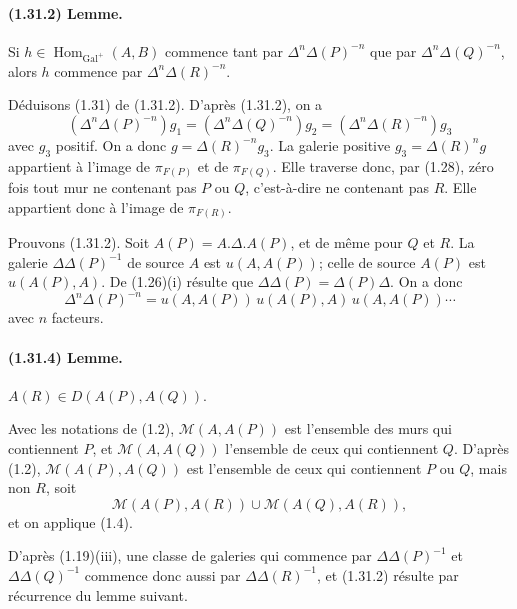 \documentclass[10pt]{article}
\begin{document}
\paragraph{(1.31.2) Lemme.} Si \(h\in\operatorname{Hom}_{\operatorname{Gal}^+}(A,B)\) commence tant par \(\Delta^n\Delta(P)^{-n}\) que par \(\Delta^n\Delta(Q)^{-n}\), alors \(h\) commence par \(\Delta^n\Delta(R)^{-n}\).

Déduisons (1.31) de (1.31.2). D'après (1.31.2), on a
\[
(\Delta^n\Delta(P)^{-n})g_1=(\Delta^n\Delta(Q)^{-n})g_2=(\Delta^n\Delta(R)^{-n})g_3
\]
avec \(g_3\) positif. On a donc \(g=\Delta(R)^{-n}g_3\). La galerie positive \(g_3=\Delta(R)^n g\) appartient à l'image de \(\pi_{F(P)}\) et de \(\pi_{F(Q)}\). Elle traverse donc, par (1.28), zéro fois tout mur ne contenant pas \(P\) ou \(Q\), c'est-à-dire ne contenant pas \(R\). Elle appartient donc à l'image de \(\pi_{F(R)}\).

Prouvons (1.31.2). Soit \(A(P)=A.\Delta.A(P)\), et de même pour \(Q\) et \(R\). La galerie \(\Delta\Delta(P)^{-1}\) de source \(A\) est \(u(A,A(P))\); celle de source \(A(P)\) est \(u(A(P),A)\). De (1.26)(i) résulte que \(\Delta\Delta(P)=\Delta(P)\Delta\). On a donc
\[
\tag{1.31.3}
\Delta^n\Delta(P)^{-n}=u(A,A(P))\,u(A(P),A)\,u(A,A(P))\cdots
\]
avec \(n\) facteurs.

\paragraph{(1.31.4) Lemme.} \(A(R)\in D(A(P),A(Q))\).

Avec les notations de (1.2), \(\mathcal M(A,A(P))\) est l'ensemble des murs qui contiennent \(P\), et \(\mathcal M(A,A(Q))\) l'ensemble de ceux qui contiennent \(Q\). D'après (1.2), \(\mathcal M(A(P),A(Q))\) est l'ensemble de ceux qui contiennent \(P\) ou \(Q\), mais non \(R\), soit
\[
\mathcal M(A(P),A(R))\cup \mathcal M(A(Q),A(R)),
\]
et on applique (1.4).

D'après (1.19)(iii), une classe de galeries qui commence par \(\Delta\Delta(P)^{-1}\) et \(\Delta\Delta(Q)^{-1}\) commence donc aussi par \(\Delta\Delta(R)^{-1}\), et (1.31.2) résulte par récurrence du lemme suivant.
\end{document}
